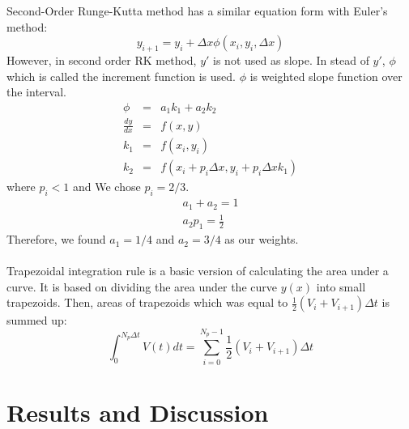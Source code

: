 \documentclass[letterpaper,12pt]{article}
\begin{document}
Second-Order Runge-Kutta method has a similar equation form with Euler's method:
\begin{equation}
y_{i+1} = y_i + \Delta x \phi (x_i , y_i, \Delta x)
\label{eq:rk2}
\end{equation}
However, in second order RK method, $y\prime $ is not used as slope. In stead of $y\prime $, $\phi$ which is 
called the increment function is used. $\phi$ is weighted slope function over the interval.
\begin{eqnarray}
\phi&=&a_1k_1 + a_2k_2\\
\frac{dy}{dx}&=&f(x,y) \nonumber\\
k_1&=&f(x_i,y_i) \nonumber\\
k_2&=&f(x_i+p_i\Delta x, y_i+p_i\Delta x k_1) \nonumber
\end{eqnarray}
where $p_i<1$  and
We chose $p_i = 2/3 $.
\begin{eqnarray}
a_1+a_2 = 1  \nonumber \\
a_2p_1 = \frac{1}{2} \nonumber 
\end{eqnarray}
Therefore, we found $a_1=1/4$ and $a_2=3/4$ as our weights.
\\\\
Trapezoidal integration rule is a basic version of calculating the area under a curve. It is based on
dividing the area under the curve $y(x)$ into small trapezoids. Then, areas of trapezoids which was equal to 
$\frac {1}{2}(V_i+V_{i+1})\Delta t $ is summed up:
\begin{equation}
\int_{0}^{N_p\Delta t} V(t) dt = \sum_{i=0}^{N_p-1} \frac{1}{2}(V_i+V_{i+1}) \Delta t 
\end{equation}

\newpage

\section{Results and Discussion}
\end{document}
